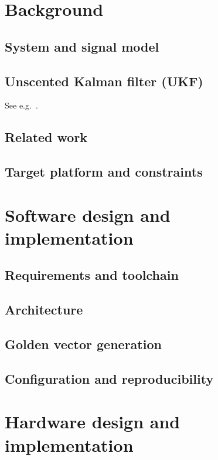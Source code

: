 \documentclass{svproc}
\begin{document}
\section{Background}
\label{sec:background}

\subsection{System and signal model}

\subsection{Unscented Kalman filter (UKF)}
See e.g.\ \cite{julier1997consistent,wan2000unscented}.

\subsection{Related work}

\subsection{Target platform and constraints}

\section{Software design and implementation}
\label{sec:sw}

\subsection{Requirements and toolchain}

\subsection{Architecture}

\subsection{Golden vector generation}

\subsection{Configuration and reproducibility}

\section{Hardware design and implementation}
\label{sec:hw}
\end{document}
